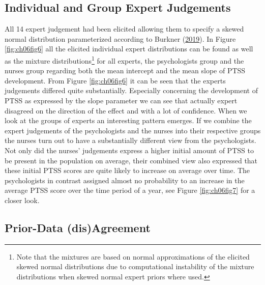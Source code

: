 \documentclass[openright,titlepage,12pt,a4paper]{book}
\let\rmarkdownfootnote\footnote%
\def\footnote{\protect\rmarkdownfootnote}
\begin{document}
\hypertarget{individual-and-group-expert-judgements}{%
\subsection{Individual and Group Expert Judgements}\label{individual-and-group-expert-judgements}}

All 14 expert judgement had been elicited allowing them to specify a skewed normal distribution parameterized according to Burkner (\protect\hyperlink{ref-burkner_parameterization_2019}{2019}). In Figure \ref{fig:ch06fig6} all the elicited individual expert distributions can be found as well as the mixture distributions\footnote{Note that the mixtures are based on normal approximations of the elicited skewed normal distributions due to computational instability of the mixture distributions when skewed normal expert priors where used.} for all experts, the psychologists group and the nurses group regarding both the mean intercept and the mean slope of PTSS development. From Figure \ref{fig:ch06fig6} it can be seen that the experts judgements differed quite substantially. Especially concerning the development of PTSS as expressed by the slope parameter we can see that actually expert disagreed on the direction of the effect and with a lot of confidence. When we look at the groups of experts an interesting pattern emerges. If we combine the expert judgements of the psychologists and the nurses into their respective groups the nurses turn out to have a substantially different view from the psychologists. Not only did the nurses' judgements express a higher initial amount of PTSS to be present in the population on average, their combined view also expressed that these initial PTSS scores are quite likely to increase on average over time. The psychologists in contrast assigned almost no probability to an increase in the average PTSS score over the time period of a year, see Figure \ref{fig:ch06fig7} for a closer look.

\hypertarget{prior-data-disagreement}{%
\subsection{Prior-Data (dis)Agreement}\label{prior-data-disagreement}}
\end{document}
